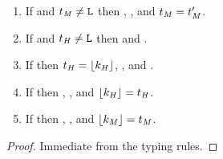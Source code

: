 \begin{lemma}
\begin{enumerate}

\item If \judeh{\env}{\exphm{\tylump}{\first{\vartym}}{\varexpm}}{\tylump} and $t_{\mathit{M}} \neq \mathtt{L}$ then \judtm{\env}{\first{\vartym}}, \judem{\env}{\varexpm}{\second{\vartym}}, and $t_{\mathit{M}} = t_{\mathit{M}}'$.


\item If \judeh{\env}{\exphm{\first{\vartyh}}{\tylump}{\varexpm}}{\second{\vartyh}} and $t_{\mathit{H}} \neq \mathtt{L}$ then \judth{\env}{\vartyh} and \judem{\env}{\varexpm}{\tylump}.


\item If \judeh{\env}{\exphs{\varcsh}{\varexps}}{\vartyh} then $t_{\mathit{H}} = \lfloor k_{\mathit{H}} \rfloor$, \judth{\env}{\tyunbrand{\varcsh}}, and \judes{\env}{\varexps}{\tytst}.



\item If \judes{\env}{\expsh{\varcsh}{\varexph}}{\tytst} then \judth{\env}{\tyunbrand{\varcsh}}, \judeh{\env}{\varexph}{\vartyh}, and $\lfloor k_{\mathit{H}} \rfloor = t_{\mathit{H}}$.


\item If \judes{\env}{\expsm{\varcsm}{\varexpm}}{\tytst} then \judtm{\env}{\tyunbrand{\varcsm}}, \judem{\env}{\varexpm}{\vartym}, and $\lfloor k_{\mathit{M}} \rfloor = t_{\mathit{M}}$.

\end{enumerate}

\begin{proof}

Immediate from the typing rules.

\end{proof}

\end{lemma}
